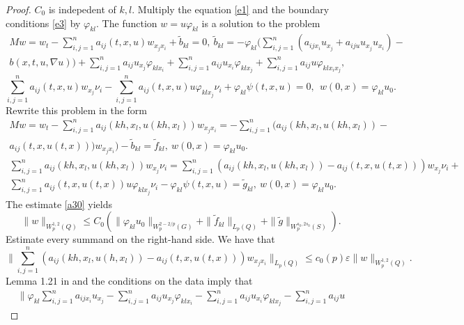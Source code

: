 \documentclass{article}
\theoremstyle{plain}
\begin{document}
\begin{proof}
  $C_0$ is indepedent of  $k,l$.
Multiply the equation  \eqref{e1}  and the boundary conditions  \eqref{e3} by $\varphi_{kl}$. The function  $w=u\varphi_{kl}$ is a solution to the problem 
   \begin{multline}\label{e26}
	Mw= w_t-\sum_{i,j=1}^n a_{ij}(t,x,u)w_{x_jx_i}+  \tilde{b}_{kl}=0,\  \tilde{b}_{kl}= -\varphi_{kl}(\sum_{i,j=1}^n  (a_{ijx_i}u_{x_j}+a_{iju}u_{x_j}u_{x_i})- \\  b(x,t,u,\nabla u))  + \sum_{i,j=1}^n  a_{ij}u_{x_j}\varphi_{kl x_i}+ \sum_{i,j=1}^n  a_{ij}u_{x_i}\varphi_{klx_j}+\sum_{i,j=1}^n  a_{ij}u\varphi_{klx_ix_j}, 
\end{multline}
 \begin{equation}\label{e27}
	\sum_{i,j=1}^n a_{ij}(t,x,u)w_{x_j}\nu_i- \sum_{i,j=1}^n a_{ij}(t,x,u)u\varphi _{kl x_j}\nu_i+ \varphi_{kl} \psi(t,x,u)=0, \   \  w(0,x)=\varphi_{kl}u_0.     
\end{equation}
 Rewrite this problem in the form 
   \begin{multline}\label{e28}
	Mw= w_t-\sum_{i,j=1}^n a_{ij}(kh,x_l,u(k h,x_l))w_{x_jx_i}=-\sum_{i,j=1}^n (a_{ij}(kh,x_l,u(kh,x_l))- 
\\ a_{ij}(t,x,u(t,x))) w_{x_jx_i})- \tilde{b}_{kl}=\tilde{f}_{kl},\   w(0,x)=\varphi_{kl}u_0.     
\end{multline}
 \begin{multline}\label{e29}
	\sum_{i,j=1}^n a_{ij}(kh,x_l,u(kh,x_l))w_{x_j}\nu_i=\sum_{i,j=1}^n (a_{ij}(kh,x_l,u(kh,x_l))-a_{ij}(t,x,u(t,x)))w_{x_j}\nu_i+\\  \sum_{i,j=1}^n a_{ij}(t,x,u(t,x)) u\varphi _{klx_j}\nu_i- \varphi_{kl} \psi(t,x,u)=\tilde{g}_{kl},\ 
  w(0,x)=\varphi_{kl}u_0.     
\end{multline}
The estimate  \eqref{a30} yields 
\begin{equation}\label{e30}
 \|w\|_{W_{p}^{1,2}(Q)}\leq
C_{0}(\|\varphi_{kl}u_0 \|_{W_{p}^{2-2/p}(G)}+
\|\tilde{f}_{kl}\|_{L_{p}(Q)}+\|\tilde{g}\|_{W_{p}^{s_{0},2s_{0}}(S)}).
\end{equation}
Estimate every summand on the right-hand side.   
We have that 
\begin{equation}\label{e31}
 \|\sum_{i,j=1}^n (a_{ij}(kh,x_l,u(h,x_l))-a_{ij}(t,x,u(t,x)))w_{x_jx_i}\|_{L_p(Q)}\leq c_0(p)\varepsilon \|w\|_{W_p^{1,2}(Q)}. 
\end{equation} 
 Lemma  1.21 in \cite{pya11} and the conditions on the data imply that
\begin{multline}\label{e32}
 \| \varphi_{kl}\sum_{i,j=1}^n  a_{ijx_i}u_{x_j}-\sum_{i,j=1}^n  a_{ij}u_{x_j}\varphi_{klx_i}- \sum_{i,j=1}^n  a_{ij}u_{x_i}\varphi_{klx_j}-\sum_{i,j=1}^n  a_{ij}u

\end{multline}
\end{proof}
\end{document}
